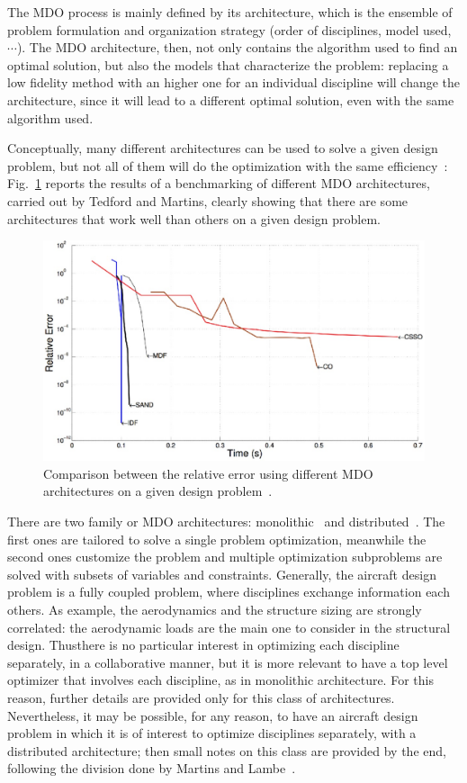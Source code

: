 The MDO process is mainly defined by its architecture, which is the ensemble of problem formulation and organization strategy (order of disciplines, model used, $\cdots$). 
The MDO architecture, then, not only contains the algorithm used to find an optimal solution, but also the models that characterize the problem: replacing a low fidelity method with an higher one for an individual discipline will change the architecture, since it will lead to a different optimal solution, even with the same algorithm used. 

Conceptually, many different architectures can be used to solve a given design problem, but not all of them will do the optimization with the same efficiency~\cite{bib:tedford, bib:martins_2009, bib:padula}: Fig.~\ref{fig:mdo_benchmarking} reports the results of a benchmarking of different MDO architectures, carried out by Tedford and Martins, clearly showing that there are some architectures that work well than others on a given design problem.
\begin{figure}[!h]
	\centering
	\includegraphics[keepaspectratio, width=0.8\linewidth]{images/app_mdo/mdo_arch_benchmarking.jpg}
	\caption{Comparison between the relative error using different MDO architectures on a given design problem~\cite{bib:tedford}.}
	\label{fig:mdo_benchmarking}
\end{figure}

There are two family or MDO architectures: monolithic~\cite{bib:cramer} and distributed~\cite{bib:dantzig, bib:benders}. 
The first ones are tailored to solve a single problem optimization, meanwhile the second ones customize the problem and multiple optimization subproblems are solved with subsets of variables and constraints. 
Generally, the aircraft design problem is a fully coupled problem, where disciplines exchange information each others. 
As example, the aerodynamics and the structure sizing are strongly correlated: the aerodynamic loads are the main one to consider in the structural design. 
Thusthere is no particular interest in optimizing each discipline separately, in a collaborative manner, but it is more relevant to have a top level optimizer that involves each discipline, as in monolithic architecture. 
For this reason, further details are provided only for this class of architectures. 
Nevertheless, it may be possible, for any reason, to have an aircraft design problem in which it is of interest to optimize disciplines separately, with a distributed architecture; then small notes on this class are provided by the end, following the division done by Martins and Lambe~\cite{bib:martins_mdo}. 

